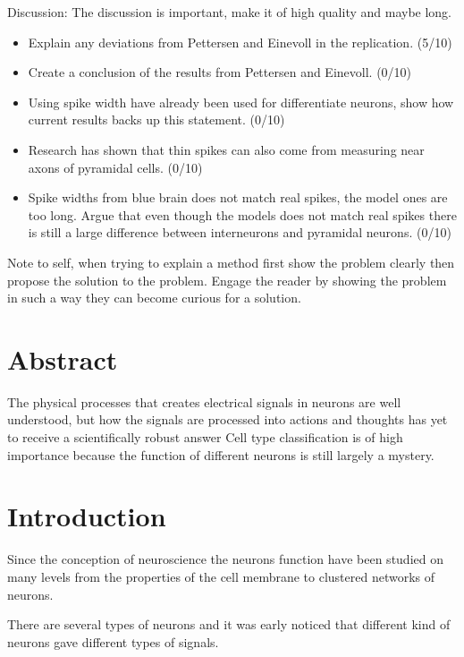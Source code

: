 \documentclass[altfont, fleqn]{uiophd}
\begin{document}
Discussion:
\newline
The discussion is important, make it of high quality and maybe long. 
\begin{itemize}
    \item Explain any deviations from Pettersen and Einevoll in the replication. (5/10)
    \item Create a conclusion of the results from Pettersen and Einevoll. (0/10)
    \item Using spike width have already been used for differentiate neurons, 
        show how current results backs up this statement. (0/10)
    \item Research has shown that thin spikes can also come from measuring near
        axons of pyramidal cells. (0/10)
    \item Spike widths from blue brain does not match real spikes, the
        model ones are too long. Argue that even though the models does not match
        real spikes there is still a large difference between interneurons and 
        pyramidal neurons. (0/10)
\end{itemize}

Note to self, when trying to explain a method first show the problem clearly
then propose the solution to the problem. Engage the reader by showing the 
problem in such a way they can become curious for a solution. 


\chapter*{Abstract}
\noindent
The physical processes that creates electrical signals in neurons are well understood, 
but how the signals are processed into actions and thoughts has yet to 
receive a scientifically robust answer
Cell type classification is of high importance because the function of different 
neurons is still largely a mystery. 
\setcounter{tocdepth}{1}
\startcontents
\tableofcontents
\chapter{Introduction}

Since 
the conception of neuroscience the neurons function have been studied on many levels
from the properties of the cell membrane to clustered networks of neurons.


There are several types of neurons 
and it was early noticed that different kind of neurons gave different
types of signals. 
\end{document}
